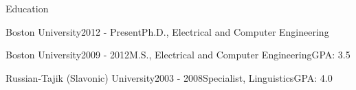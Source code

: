 \begin {rSection} {Education}
  \begin{rSubsection}{Boston University}{2012 - Present}{Ph.D., Electrical and Computer Engineering}{}
  \end{rSubsection}
  \begin{rSubsection}{Boston University}{2009 - 2012}{M.S., Electrical and Computer Engineering}{GPA: 3.5}
  \end{rSubsection}
  \begin{rSubsection}{Russian-Tajik (Slavonic) University}{2003 - 2008}{Specialist, Linguistics}{GPA: 4.0}
  \end{rSubsection}
\end{rSection}
